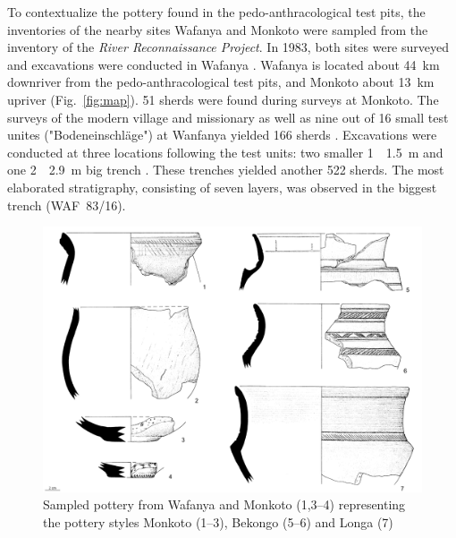 \documentclass[a4paper]{article}
\begin{document}
To contextualize the pottery found in the pedo-anthracological test pits, the inventories of the nearby sites Wafanya and Monkoto were sampled from the inventory of the \textit{River Reconnaissance Project}. In 1983, both sites were surveyed and excavations were conducted in Wafanya \citep[399--400]{Wotzka.1995}. Wafanya is located about 44~km downriver from the pedo-anthracological test pits, and Monkoto about 13~km upriver (Fig.~\ref{fig:map}). 51 sherds were found during surveys at Monkoto. The surveys of the modern village and missionary as well as nine out of 16 small test unites ("Bodeneinschläge") at Wanfanya yielded 166 sherds \citep[399--400]{Wotzka.1995}. Excavations were conducted at three locations following the test units: two smaller 1~\texttimes~1.5~m and one 2~\texttimes~2.9~m big trench \citep[360--368]{Wotzka.1995}. These trenches yielded another 522 sherds. The most elaborated stratigraphy, consisting of seven layers, was observed in the biggest trench (WAF~83/16). 

\begin{figure}[H]
	\includegraphics[width=\textwidth]{Fig_WafanyaMonkoto_PotterySampled.pdf}
	\caption{Sampled pottery from Wafanya \citep[2,5--6;][503 Pl.~69--504 Pl.~70]{Wotzka.1995} and Monkoto (1,3--4) representing the pottery styles Monkoto (1--3), Bekongo (5--6) and Longa (7) }
	\label{fig:wafmon.pottery}
\end{figure}
\end{document}

